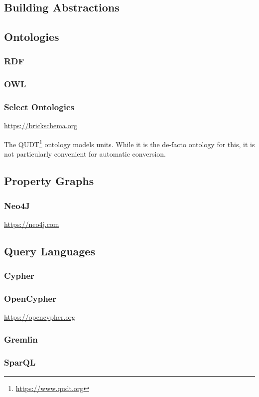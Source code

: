 \subsection{Building Abstractions}



\subsection{Ontologies}
\subsubsection{RDF}
\subsubsection{OWL}
\subsubsection{Select Ontologies}

\url{https://brickschema.org}



The QUDT\footnote{\url{https://www.qudt.org}} ontology models units. While it is the de-facto ontology for this, it is not particularly convenient for automatic conversion.

\subsection{Property Graphs}
\subsubsection{Neo4J}

\url{https://neo4j.com}

\subsection{Query Languages}
\subsubsection{Cypher}
\subsubsection{OpenCypher}

\url{https://opencypher.org}

\subsubsection{Gremlin}
\subsubsection{SparQL}



